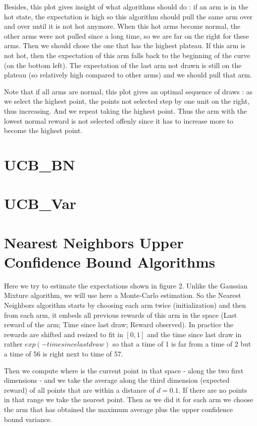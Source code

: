 \documentclass{article} %
\begin{document}
Besides, this plot gives insight of what algorithms should do : if an arm is in the hot state, the expectation is high so this algorithm should pull the same arm over and over until it is not hot anymore. When this hot arms become normal, the other arms were not pulled since a long time, so we are far on the right for these arms. Then we should chose the one that has the highest plateau. If this arm is not hot, then the expectation of this arm falls back to the beginning of the curve (on the bottom left). The expectation of the last arm not drawn is still on the plateau (so relatively high compared to other arms) and we should pull that arm.

Note that if all arms are normal, this plot gives an optimal sequence of draws : as we select the highest point, the points not selected step by one unit on the right, thus increasing. And we repeat taking the highest point. Thus the arm with the lowest normal reward is not selected offenly since it has to increase more to become the highest point.

\section{UCB\_BN}

\section{UCB\_Var}

\section{Nearest Neighbors Upper Confidence Bound Algorithms}

Here we try to estimate the expectations shown in figure 2. Unlike the Gaussian Mixture algorithm, we will use here a Monte-Carlo estimation. So the Nearest Neighbors algorithm starts by choosing each arm twice (initialization) and then from each arm, it embeds all previous rewards of this arm in the space (Last reward of the arm; Time since last draw; Reward observed). In practice the rewards are shifted and resized to fit in $[0,1]$ and the time since last draw in rather $exp(-time since last draw)$ so that a time of 1 is far from a time of 2 but a time of 56 is right next to time of 57.

Then we compute where is the current point in that space - along the two first dimensions - and we take the average along the third dimension (expected reward) of all points that are within a distance of $d=0.1$. If there are no points in that range we take the nearest point. Then as we did it for each arm we choose the arm that has obtained the maximum average plus the upper confidence bound variance.
\end{document}
